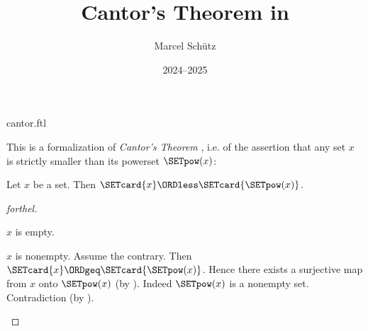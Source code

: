\documentclass{article}
\title{Cantor's Theorem in \Naproche}
\author{Marcel Schütz}
\date{2024--2025}
\begin{document}
\begin{smodule}{cantor.ftl}
\maketitle


\noindent This is a formalization of \emph{Cantor's Theorem}
\cite{Cantor1891}, i.e. of the assertion that any set $x$ is strictly smaller
than its powerset $\SETpow(x)$:

\begin{theorem}[forthel,title=Cantor's Theorem,id=cantor_389275382172394]
  Let $x$ be a set.
  Then $\SETcard{x} \ORDless \SETcard{\SETpow(x)}$.
\end{theorem}
\begin{proof}[forthel]
  \begin{case}{$x$ is empty.} \end{case}

  \begin{case}{$x$ is nonempty.}
    Assume the contrary.
    Then $\SETcard{x} \ORDgeq \SETcard{\SETpow(x)}$.
    Hence there exists a surjective map from $x$ onto $\SETpow(x)$ (by ).
    Indeed $\SETpow(x)$ is a nonempty set.
    Contradiction (by ).
  \end{case}
\end{proof}

\printbibliography
{}
\end{smodule}
\end{document}
